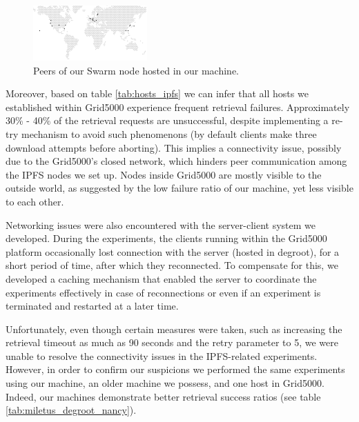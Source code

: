 \begin{figure}[htbp]
\centerline{\includegraphics[width=\textwidth]{figs/swarm_peers.pdf}}
\caption{Peers of our Swarm node hosted in our machine.}
\label{fig:swarm_peers}
\end{figure}

Moreover, based on table \ref{tab:hosts_ipfs} we can infer that all hosts we established within Grid5000 experience frequent retrieval failures. Approximately 30\% - 40\% of the retrieval requests are unsuccessful, despite implementing a re-try mechanism to avoid such phenomenons (by default clients make three download attempts before aborting). This implies a connectivity issue, possibly due to the Grid5000's closed network, which hinders peer communication among the IPFS nodes we set up. Nodes inside Grid5000 are mostly visible to the outside world, as suggested by the low failure ratio of our machine, yet less visible to each other.

Networking issues were also encountered with the server-client system we developed. During the experiments, the clients running within the Grid5000 platform occasionally lost connection with the server (hosted in degroot), for a short period of time, after which they reconnected. To compensate for this, we developed a caching mechanism that enabled the server to coordinate the experiments effectively in case of reconnections or even if an experiment is terminated and restarted at a later time.

Unfortunately, even though certain measures were taken, such as increasing the retrieval timeout as much as 90 seconds and the retry parameter to 5, we were unable to resolve the connectivity issues in the IPFS-related experiments. However, in order to confirm our suspicions we performed the same experiments using our machine, an older machine we possess, and one host in Grid5000. Indeed, our machines demonstrate better retrieval success ratios (see table \ref{tab:miletus_degroot_nancy}).

